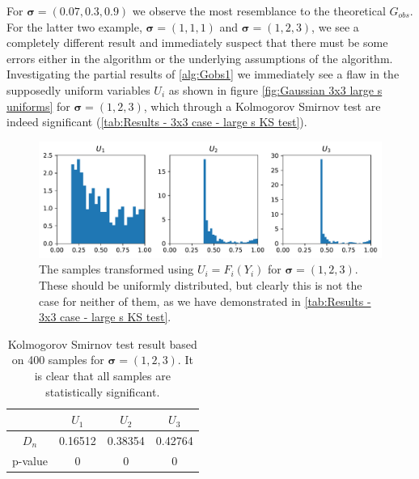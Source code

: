 \documentclass[../Thesis.tex]{subfiles}
\begin{document}
For $\boldsymbol\sigma = (0.07, 0.3, 0.9)$ we observe the most resemblance to the theoretical $G_{obs}$. For the latter two example,  $\boldsymbol\sigma = (1,1,1)$ and $\boldsymbol\sigma = (1,2,3)$, we see a completely different result and immediately suspect that there must be some errors either in the algorithm or the underlying assumptions of the algorithm. Investigating the partial results of \autoref{alg:Gobs1} we immediately see a flaw in the supposedly uniform variables $U_i$ as shown in figure \autoref{fig:Gaussian 3x3 large s uniforms} for $\boldsymbol\sigma = (1,2,3)$, which through a Kolmogorov Smirnov test are indeed significant (\autoref{tab:Results - 3x3 case - large s KS test}).
\begin{figure}[H]
    \centering
    \includegraphics[width=0.99\linewidth]{figures/ND examples/Gaussian 3x3 large s uniforms.pdf}
    \caption{The samples transformed using $U_i = F_i(Y_i)$ for $\boldsymbol\sigma = (1,2,3)$. These should be uniformly distributed, but clearly this is not the case for neither of them, as we have demonstrated in \autoref{tab:Results - 3x3 case - large s KS test}.}
    \label{fig:Gaussian 3x3 large s uniforms}
\end{figure}
\begin{table}[ht]
    \centering
    \begin{tabular}{c|c|c|c}
                & $U_1$   & $U_2$   & $U_3$   \\\hline
        $D_n$   & 0.16512 & 0.38354 & 0.42764 \\
        p-value & 0       & 0       & 0
    \end{tabular}
    \caption{Kolmogorov Smirnov test result based on 400 samples for $\boldsymbol\sigma = (1, 2, 3)$. It is clear that all samples are statistically significant.}
    \label{tab:Results - 3x3 case - large s KS test}
\end{table}


\end{document}
